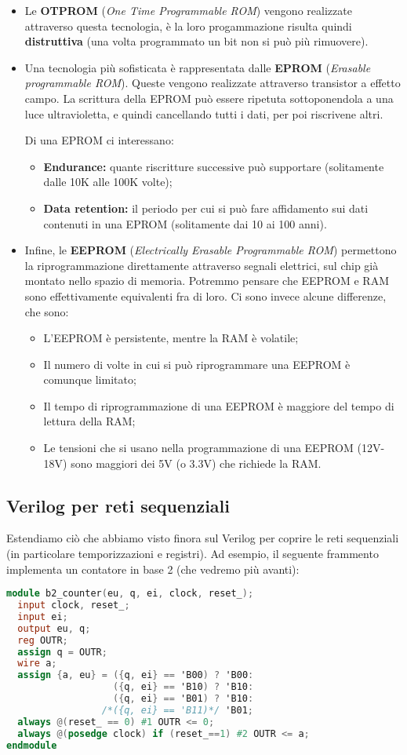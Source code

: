\documentclass[a4paper,11pt]{article}
\begin{document}
\begin{itemize}
	\item Le \textbf{OTPROM} (\textit{One Time Programmable ROM}) vengono realizzate attraverso questa tecnologia, è la loro progammazione risulta quindi \textbf{distruttiva} (una volta programmato un bit non si può più rimuovere).
	\item  Una tecnologia più sofisticata è rappresentata dalle \textbf{EPROM} (\textit{Erasable programmable ROM}).
Queste vengono realizzate attraverso transistor a effetto campo.
La scrittura della EPROM può essere ripetuta sottoponendola a una luce ultravioletta, e quindi cancellando tutti i dati, per poi riscrivene altri.

Di una EPROM ci interessano:
\begin{itemize}
	\item \textbf{Endurance:} quante riscritture successive può supportare (solitamente dalle 10K alle 100K volte);
	\item \textbf{Data retention:} il periodo per cui si può fare affidamento sui dati contenuti in una EPROM (solitamente dai 10 ai 100 anni).
\end{itemize}
	\item Infine, le \textbf{EEPROM} (\textit{Electrically Erasable Programmable ROM}) permettono la riprogrammazione direttamente attraverso segnali elettrici, sul chip già montato nello spazio di memoria.
		Potremmo pensare che EEPROM e RAM sono effettivamente equivalenti fra di loro.
		Ci sono invece alcune differenze, che sono:
		\begin{itemize}
			\item L'EEPROM è persistente, mentre la RAM è volatile;
			\item Il numero di volte in cui si può riprogrammare una EEPROM è comunque limitato;
			\item Il tempo di riprogrammazione di una EEPROM è maggiore del tempo di lettura della RAM;
			\item Le tensioni che si usano nella programmazione di una EEPROM (12V-18V) sono maggiori dei 5V (o 3.3V) che richiede la RAM. 
		\end{itemize}
\end{itemize}

\subsection{Verilog per reti sequenziali}
Estendiamo ciò che abbiamo visto finora sul Verilog per coprire le reti sequenziali (in particolare temporizzazioni e registri). 
Ad esempio, il seguente frammento implementa un contatore in base 2 (che vedremo più avanti):
\begin{lstlisting}[language=verilog, style=codestyle]	
module b2_counter(eu, q, ei, clock, reset_);
  input clock, reset_;
  input ei;
  output eu, q;
  reg OUTR;
  assign q = OUTR;	
  wire a;
  assign {a, eu} = ({q, ei} == 'B00) ? 'B00:
                   ({q, ei} == 'B10) ? 'B10:
                   ({q, ei} == 'B01) ? 'B10:
                 /*({q, ei} == 'B11)*/ 'B01;
  always @(reset_ == 0) #1 OUTR <= 0;
  always @(posedge clock) if (reset_==1) #2 OUTR <= a;
endmodule
\end{lstlisting}
\end{document}
